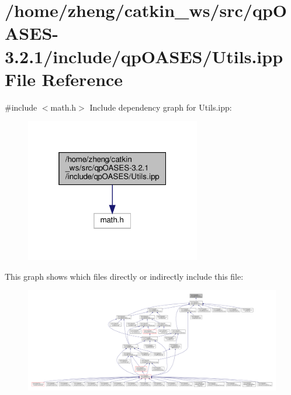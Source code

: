 \hypertarget{_utils_8ipp}{}\section{/home/zheng/catkin\+\_\+ws/src/qp\+O\+A\+S\+E\+S-\/3.2.1/include/qp\+O\+A\+S\+E\+S/\+Utils.ipp File Reference}
\label{_utils_8ipp}
{\ttfamily \#include $<$math.\+h$>$}\newline
Include dependency graph for Utils.\+ipp\+:
\nopagebreak
\begin{figure}[H]
\begin{center}
\leavevmode
\includegraphics[width=217pt]{_utils_8ipp__incl}
\end{center}
\end{figure}
This graph shows which files directly or indirectly include this file\+:
\nopagebreak
\begin{figure}[H]
\begin{center}
\leavevmode
\includegraphics[width=350pt]{_utils_8ipp__dep__incl}
\end{center}
\end{figure}
